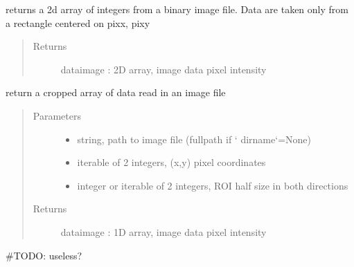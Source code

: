 \documentclass[letterpaper,10pt,english]{sphinxmanual}
\begin{document}
\begin{fulllineitems}
\label{\detokenize{PeakSearch:LaueTools.readmccd.readrectangle_in_image}}
returns a 2d array of integers from a binary image file. Data are taken only from a rectangle
centered on pixx, pixy
\begin{quote}\begin{description}
\item[{Returns}] \leavevmode
dataimage : 2D array, image data pixel intensity

\end{description}\end{quote}

\end{fulllineitems}


\begin{fulllineitems}
\label{\detokenize{PeakSearch:LaueTools.readmccd.readoneimage_crop}}
return a cropped array of data read in an image file
\begin{quote}\begin{description}
\item[{Parameters}] \leavevmode\begin{itemize}
\item {} 
 \textendash{} string, path to image file (fullpath if {}` dirname{}`=None)

\item {} 
 \textendash{} iterable of 2 integers, (x,y) pixel coordinates

\item {} 
 \textendash{} integer or iterable of 2 integers, ROI half size in both directions

\end{itemize}

\item[{Returns}] \leavevmode
dataimage : 1D array, image data pixel intensity

\end{description}\end{quote}

\#TODO: useless?

\end{fulllineitems}
\end{document}
